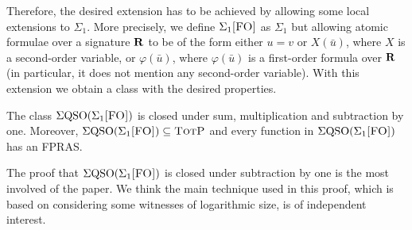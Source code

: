 Therefore, the desired extension has to be achieved by allowing some local extensions to $\Sigma_1$. More precisely, we define $\Sigma_{1}\textsc{[FO]}$ as $\Sigma_1$ but allowing atomic formulae over a signature $\mathbf{R}$ to be of the form either $u = v$ or $X(\bar u)$, where $X$ is a second-order variable, or $\varphi(\bar u)$, where $\varphi(\bar u)$ is a first-order formula over $\mathbf{R}$ (in particular, it does not mention any second-order variable). With this extension we obtain a class with the desired properties.
\begin{theorem}\label{sigmafo-minusone}
The class $\Sigma{\rm QSO}(\Sigma_{1}\textsc{[FO]})$ is closed under sum, multiplication and subtraction by one. Moreover, $\Sigma{\rm QSO}(\Sigma_{1}\textsc{[FO]}) \subseteq \text{\sc TotP}$ and every function in $\Sigma{\rm QSO}(\Sigma_{1}\textsc{[FO]})$ has an FPRAS.
\end{theorem}
The proof that $\Sigma{\rm QSO}(\Sigma_{1}\textsc{[FO]})$ is closed under subtraction by one is the most involved of the paper. We think the main technique used in this proof, which is based on considering some witnesses of logarithmic size, is of independent interest. 


%


